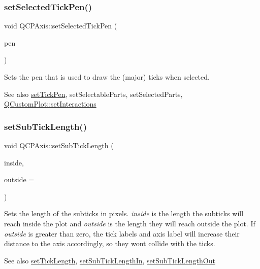 \subsubsection{\texorpdfstring{set\+Selected\+Tick\+Pen()}{setSelectedTickPen()}}
{\footnotesize\ttfamily void Q\+C\+P\+Axis\+::set\+Selected\+Tick\+Pen (\begin{DoxyParamCaption}\item[{const Q\+Pen \&}]{pen }\end{DoxyParamCaption})}

Sets the pen that is used to draw the (major) ticks when selected.

\begin{DoxySeeAlso}{See also}
\hyperlink{class_q_c_p_axis_ad80923bcc1c5da4c4db602c5325e797e}{set\+Tick\+Pen}, set\+Selectable\+Parts, set\+Selected\+Parts, \hyperlink{class_q_custom_plot_a5ee1e2f6ae27419deca53e75907c27e5}{Q\+Custom\+Plot\+::set\+Interactions} 
\end{DoxySeeAlso}
\mbox{\label{class_q_c_p_axis_ab702d6fd42fc620607435339a1c2a2e1}} 
\subsubsection{\texorpdfstring{set\+Sub\+Tick\+Length()}{setSubTickLength()}}
{\footnotesize\ttfamily void Q\+C\+P\+Axis\+::set\+Sub\+Tick\+Length (\begin{DoxyParamCaption}\item[{int}]{inside,  }\item[{int}]{outside = {} }\end{DoxyParamCaption})}

Sets the length of the subticks in pixels. {\itshape inside} is the length the subticks will reach inside the plot and {\itshape outside} is the length they will reach outside the plot. If {\itshape outside} is greater than zero, the tick labels and axis label will increase their distance to the axis accordingly, so they won\textquotesingle{}t collide with the ticks.

\begin{DoxySeeAlso}{See also}
\hyperlink{class_q_c_p_axis_a62ec40bebe3540e9c1479a8fd2be3b0d}{set\+Tick\+Length}, \hyperlink{class_q_c_p_axis_ac46fa2a993a9f5789540977610acf1de}{set\+Sub\+Tick\+Length\+In}, \hyperlink{class_q_c_p_axis_a4c6dfc3963492ed72a77724012df5f23}{set\+Sub\+Tick\+Length\+Out} 
\end{DoxySeeAlso}
\mbox{\label{class_q_c_p_axis_ac46fa2a993a9f5789540977610acf1de}} 
